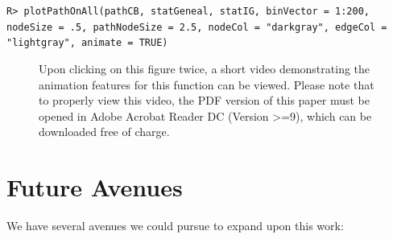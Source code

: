 \documentclass[11pt,a4paper,oldfontcommands,openany]{memoir}
\DeclareRobustCommand{\mybox}[2][gray!15]{%
\begin{tcolorbox}[   %
        breakable,
        left=0pt,
        right=0pt,
        top=0pt,
        bottom=0pt,
        colback=#1,
        colframe=#1,
        width=\dimexpr\textwidth\relax, 
        enlarge left by=0mm,
        boxsep=5pt,
        arc=0pt,outer arc=0pt,
        ]
        #2
\end{tcolorbox}
}
\numberwithin{equation}{section} %
\begin{document}
\mybox{
\texttt{R> plotPathOnAll(pathCB, statGeneal, statIG, binVector = 1:200, nodeSize = .5, pathNodeSize = 2.5, nodeCol = "darkgray", edgeCol = "lightgray", animate = TRUE)}
}

\begin{figure}[H]
    \begin{framed}
    \centering
    \end{framed}
    \caption{Upon clicking on this figure twice, a short video demonstrating the animation features for this function can be viewed. Please note that to properly view this video, the PDF version of this paper must be opened in Adobe Acrobat Reader DC (Version >=9), which can be downloaded free of charge.}
    \label{fig:plotAnimate}
\end{figure}

\section{Future Avenues}

We have several avenues we could pursue to expand upon this work:
\end{document}
